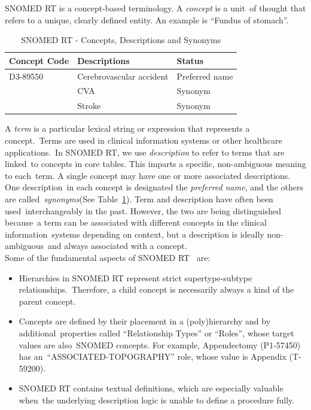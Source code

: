 \documentclass[DIV=calc, paper=a4, fontsize=12pt, onecolumn]{scrartcl}	 %
\begin{document}
  \noindent SNOMED RT is a concept-based terminology. A \emph{concept} is a unit\
  of thought that refers to a unique, clearly defined entity. An example is ``Fundus of stomach''.\
  \begin{table}[ht!]
    \centering
    \begin{tabular}{| l | l | l |}
      \hline
      Concept Code & Descriptions                      & Status \\ \hline \hline
      D3-89550        & Cerebrovascular accident & Preferred name\\
                              & CVA                                   & Synonym\\
                              & Stroke                               & Synonym\\                   
      \hline
      \end{tabular}
    \caption{SNOMED RT - Concepts, Descriptions and Synonyms}\citep[Table.~1]{a_y_wang_mapping_2001}
    \label{tab:snomedrt_example}
  \end{table}
  A \emph{term} is a particular lexical string or expression that represents a concept.\
  Terms are used in clinical information systems or other healthcare applications.\
  In SNOMED RT, we use \emph{description} to refer to terms that are linked\
  to concepts in core tables. This imparts a specific, non-ambiguous meaning to each\
  term. A single concept may have one or more associated descriptions. One description\
  in each concept is designated the \emph{preferred name}, and the others are called\
  \emph{synonyms}(See Table~\ref{tab:snomedrt_example}). Term and description have often been used\
  interchangeably in the past. However, the two are being distinguished because\
  a term can be associated with different concepts in the clinical information\
  systems depending on context, but a description is ideally non-ambiguous\
  and always associated with a concept.\\
  
  \noindent Some of the fundamental aspects of SNOMED RT~\citep{dolin_snomed_2001} are:
  \begin{itemize}
    \itemsep0ex
    \item Hierarchies in SNOMED RT represent strict supertype-subtype relationships.\
    Therefore, a child concept is necessarily always a kind of the parent concept.
    \item Concepts are defined by their placement in a (poly)hierarchy and by additional\
    properties called ``Relationship Types'' or ``Roles'', whose target values are also\
    SNOMED concepts. For example, Appendectomy (P1-57450) has an\
    ``ASSOCIATED-TOPOGRAPHY'' role, whose value is Appendix (T-59200).
    \item SNOMED RT contains textual definitions, which are especially valuable when\
    the underlying description logic is unable to define a procedure fully.
  \end{itemize}
  
\end{document}
